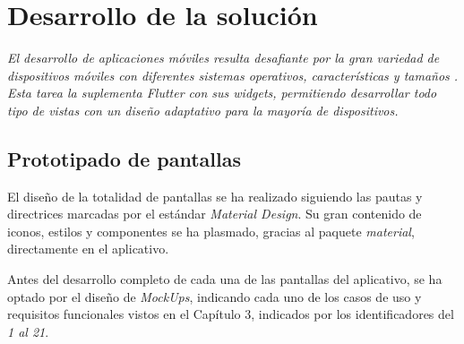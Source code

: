 \chapter{Desarrollo de la solución}
\textit{El desarrollo de aplicaciones móviles resulta desafiante por la gran variedad de dispositivos
móviles con diferentes sistemas operativos, características y tamaños \cite{7021823}. Esta tarea
la suplementa Flutter con sus widgets, permitiendo
desarrollar todo tipo de vistas con un diseño adaptativo para la mayoría de dispositivos.
}

\section{Prototipado de pantallas}
El diseño de la totalidad de pantallas se ha realizado siguiendo las pautas y directrices marcadas por
el estándar \textit{Material Design}. Su gran contenido de iconos, estilos y componentes se ha plasmado,
gracias al paquete \textit{material}, directamente en el aplicativo.

Antes del desarrollo completo de cada una de las pantallas del aplicativo, se ha optado por el diseño de
\textit{MockUps}, indicando cada uno de los casos de uso y requisitos funcionales vistos en el Capítulo 
3, indicados por los identificadores del \textit{1 al 21}.


